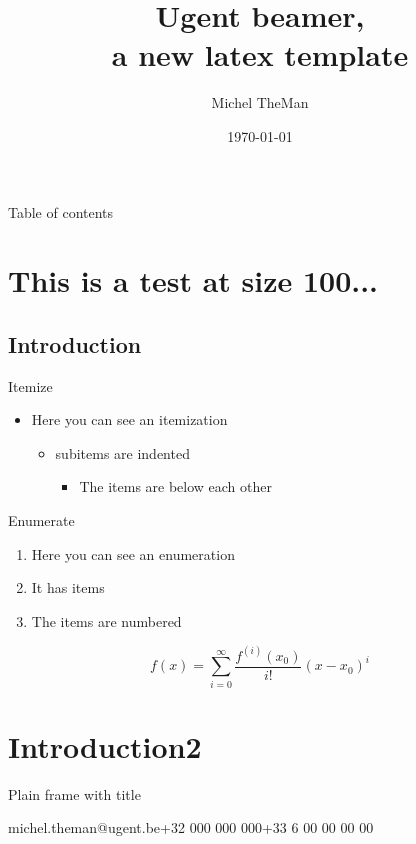 \documentclass[ aspectratio=169]{beamer}
\title{Ugent beamer,\\a new latex template}
\date{\today}
\author{Michel TheMan}
\institute{\textbf{Department of Environment}\\\vspace{-.4cm}Laboratory of Wood Technology, UGent-Woodlab }
\begin{document}
\frame{\titlepage} 
\begin{frame}{Table of contents}
	\tableofcontents
\end{frame} 
      
\section{This is a test at size 100...}
\subsection{Introduction}
  
\begin{frame}[fragile, t]{Itemize}    
\begin{itemize}
\item Here you can see an itemization
\begin{itemize}               
\item subitems are indented
\begin{itemize}
\item The items are below each other
\end{itemize}
\end{itemize}
\end{itemize}
\end{frame}
 
\begin{frame}{Enumerate}
\begin{enumerate}
\item Here you can see an enumeration 
\item It has items
\item The items are numbered    
\end{enumerate}
\[
	f(x)=\sum_{i=0}^\infty \frac{f^{(i)}(x_0)}{i!}(x-x_0)^i
\]
\end{frame}
  
\section{Introduction2}     
   
\begin{frame}[t]{Plain frame with title}
\lipsum[4]           
\end{frame}

	{michel.theman@ugent.be}{+32 000 000 000}{+33 6 00 00 00 00}    
\end{document}
